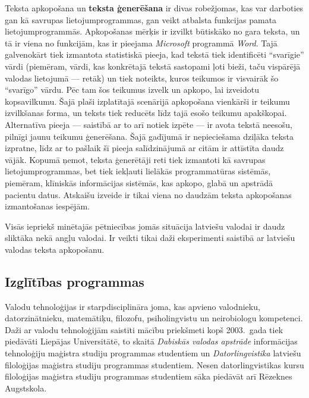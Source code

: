 \begin{multicols}{2}

Teksta apkopošana un \textbf{teksta ģenerēšana} ir divas robežjomas, kas var darboties gan kā savrupas lietojumprogrammas, gan veikt atbalsta funkcijas pamata lietojumprogrammās.  Apkopošanas mērķis ir izvilkt būtiskāko no gara teksta, un tā ir viena no funk\-cijām, kas ir pieejama \textit{Microsoft} programmā \textit{Word}.  Tajā galvenokārt tiek izmantota statistiskā pieeja, kad tekstā tiek identificēti “svarīgie” vārdi (piemēram, vārdi, kas konkrētajā tekstā sastopami ļoti bieži, taču vispārējā valodas lietojumā --- retāk) un tiek noteikts, kuros teikumos ir visvairāk šo “svarīgo” vārdu.  Pēc tam šos teikumus izvelk un apkopo, lai izveidotu kopsavilkumu.  Šajā plaši izplatītajā scenārijā apkopošana vienkārši ir teikumu izvilkšanas forma, un teksts tiek reducēts līdz tajā esošo teikumu apakškopai.  Alternatīva pieeja --- saistībā ar to arī notiek izpēte --- ir avota tekstā neesošu, pilnīgi jaunu teikumu ģenerēšana.  Šajā gadījumā ir nepieciešama dziļāka teksta izpratne, līdz ar to pašlaik šī pieeja salīdzinājumā ar citām ir attīstīta daudz vājāk.  Kopumā ņemot, teksta ģenerētāji reti tiek izmantoti kā savrupas lietojumprogrammas, bet tiek iekļauti lielākās \mbox{programmatūras} \mbox{sistēmās,} \mbox{piemēram}, klīniskās informācijas sistēmās, kas apkopo, glabā un apstrādā pacientu datus.  Atskaišu izveide ir tikai viena no daudzām teksta apkopošanas izmantošanas iespējām.

Visās iepriekš minētajās pētniecības jomās situācija latviešu valodai ir daudz sliktāka nekā angļu valodai. 
Ir veikti tikai daži eksperimenti saistībā ar latviešu valodas teksta apkopošanu.

\subsection{Izglītības programmas}

Valodu tehnoloģijas ir starpdisciplināra joma, kas apvieno valodnieku, datorzinātnieku, matemātiķu, filozofu, psiholingvistu un neirobiologu kompetenci. 
Daži ar valodu tehnoloģijām saistīti mācību priekšmeti kopš 2003.~gada tiek piedāvāti Liepājas Universitātē, to skaitā \textit{Dabiskās valodas apstrāde} informācijas tehnoloģiju maģistra studiju programmas studentiem un \textit{Datorlingvistika} latviešu filoloģijas maģistra studiju programmas studentiem.
Nesen datorlingvistikas kursu filoloģijas maģistra studiju programmas studentiem sāka piedāvāt arī Rēzeknes Augstskola. 


\end{multicols}
